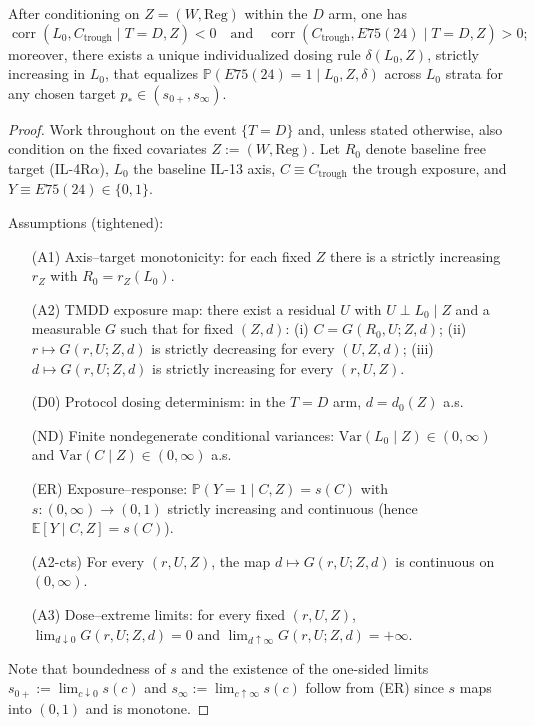 ﻿\begin{theorem}\label{thm-monotone-dosing-equalizer}
After conditioning on $Z=(W,\mathrm{Reg})$ within the $D$ arm, one has
\[
\operatorname{corr}(L_0, C_{\mathrm{trough}} \mid T{=}D, Z) < 0
\quad\text{and}\quad
\operatorname{corr}(C_{\mathrm{trough}}, E75(24) \mid T{=}D, Z) > 0;
\]
moreover, there exists a unique individualized dosing rule $\delta(L_0, Z)$, strictly increasing in $L_0$, that equalizes $\mathbb P(E75(24){=}1 \mid L_0, Z, \delta)$ across $L_0$ strata for any chosen target $p_* \in (s_{0+}, s_\infty)$.
\end{theorem}

\begin{proof}
Work throughout on the event $\{T=D\}$ and, unless stated otherwise, also condition on the fixed covariates $Z := (W, \mathrm{Reg})$. Let $R_0$ denote baseline free target (IL-4R$\alpha$), $L_0$ the baseline IL-13 axis, $C \equiv C_{\mathrm{trough}}$ the trough exposure, and $Y \equiv E75(24) \in \{0,1\}$.

Assumptions (tightened):
\begin{enumerate}
  \item[(A1)] Axis--target monotonicity: for each fixed $Z$ there is a strictly increasing $r_Z$ with $R_0 = r_Z(L_0)$.
  \item[(A2)] TMDD exposure map: there exist a residual $U$ with $U \perp L_0\mid Z$ and a measurable $G$ such that for fixed $(Z,d)$: (i) $C = G(R_0, U; Z, d)$; (ii) $r \mapsto G(r, U; Z, d)$ is strictly decreasing for every $(U, Z, d)$; (iii) $d \mapsto G(r, U; Z, d)$ is strictly increasing for every $(r, U, Z)$.
  \item[(D0)] Protocol dosing determinism: in the $T{=}D$ arm, $d = d_0(Z)$ a.s.
  \item[(ND)] Finite nondegenerate conditional variances: $\mathrm{Var}(L_0 \mid Z) \in (0, \infty)$ and $\mathrm{Var}(C \mid Z) \in (0, \infty)$ a.s.
  \item[(ER)] Exposure--response: $\mathbb P(Y{=}1 \mid C, Z) = s(C)$ with $s : (0, \infty) \to (0, 1)$ strictly increasing and continuous (hence $\mathbb E[Y \mid C, Z] = s(C)$).
  \item[(A2\textnormal{-}cts)] For every $(r, U, Z)$, the map $d \mapsto G(r, U; Z, d)$ is continuous on $(0, \infty)$.
  \item[(A3)] Dose--extreme limits: for every fixed $(r, U, Z)$, $\lim_{d\downarrow 0} G(r, U; Z, d) = 0$ and $\lim_{d\uparrow \infty} G(r, U; Z, d) = +\infty$.
\end{enumerate}
Note that boundedness of $s$ and the existence of the one-sided limits $s_{0+} := \lim_{c\downarrow 0} s(c)$ and $s_\infty := \lim_{c\uparrow \infty} s(c)$ follow from (ER) since $s$ maps into $(0,1)$ and is monotone.


\end{proof}
